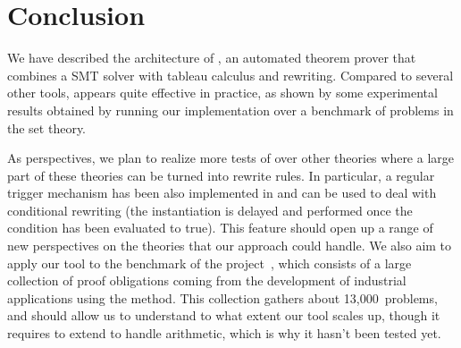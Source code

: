 
\section{Conclusion}

We have described the architecture of \archsat{}, an automated theorem prover
that combines a SMT solver with tableau calculus and rewriting. Compared to
several other tools, \archsat{} appears quite effective in practice, as shown by
some experimental results obtained by running our implementation over a
benchmark of problems in the \bmth{} set theory.

As perspectives, we plan to realize more tests of \archsat{} over other theories
where a large part of these theories can be turned into rewrite rules. In
particular, a regular trigger mechanism has been also implemented in \archsat{}
and can be used to deal with conditional rewriting (the instantiation is delayed
and performed once the condition has been evaluated to true). This feature
should open up a range of new perspectives on the theories that our approach
could handle. We also aim to apply our tool to the benchmark of the \bware{}
project~\cite{BWare}, which consists of a large collection of proof obligations
coming from the development of industrial applications using the \bmth{} method.
This collection gathers about 13,000~problems, and should allow us to understand
to what extent our tool scales up, though it requires to extend \archsat{} to
handle arithmetic, which is why it hasn't been tested yet.
